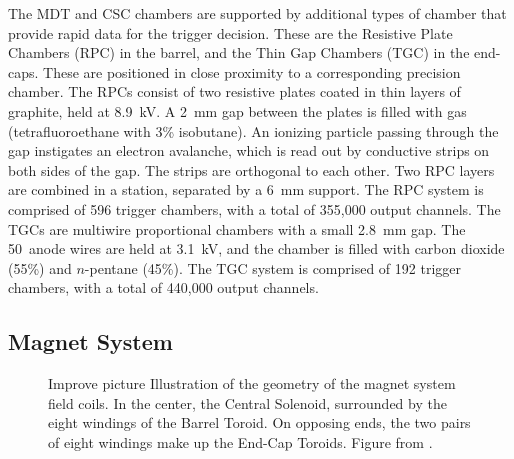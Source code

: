 The MDT and CSC chambers are supported by additional types of chamber that provide rapid data for the trigger decision.
These are the Resistive Plate Chambers (RPC) in the barrel, and the Thin Gap Chambers (TGC) in the end-caps.
These are positioned in close proximity to a corresponding precision chamber.
The RPCs consist of two resistive plates coated in thin layers of graphite, held at 8.9~kV.
A 2~mm gap between the plates is filled with gas (tetrafluoroethane with 3\% isobutane).
An ionizing particle passing through the gap instigates an electron avalanche, which is read out by conductive strips on both sides of the gap.
The strips are orthogonal to each other.
Two RPC layers are combined in a station, separated by a 6~mm support.
The RPC system is comprised of 596 trigger chambers, with a total of 355,000 output channels.
The TGCs are multiwire proportional chambers with a small 2.8~mm gap.
The 50~\um anode wires are held at 3.1~kV, and the chamber is filled with carbon dioxide (55\%) and $n$-pentane (45\%).
The TGC system is comprised of 192 trigger chambers, with a total of 440,000 output channels.
\cite{muonTdr}

\subsection{Magnet System}

\begin{figure}[h!]
\captionsetup[subfigure]{position=b}
\centering
{}
\caption{{\color{red} Improve picture} Illustration of the geometry of the magnet system field coils. In the center, the Central Solenoid, surrounded by the eight windings of the Barrel Toroid. On opposing ends, the two pairs of eight windings make up the End-Cap Toroids. Figure from \cite{magnetTdr}.}
\label{fig:atlasMagnets}
\end{figure}

